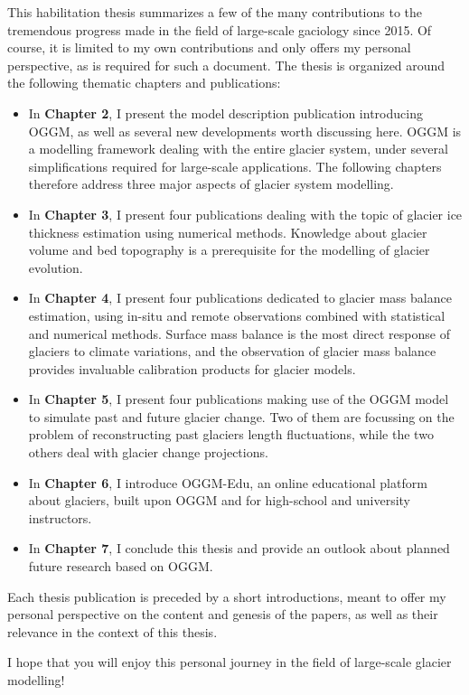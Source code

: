 This habilitation thesis summarizes a few of the many contributions to the tremendous progress made in the field of
large-scale gaciology since 2015. Of course, it is limited to my own contributions and only offers my personal perspective,
as is required for such a document. The thesis is organized around the following thematic chapters and publications:
\begin{itemize}[nosep]
\item {} 
In \textbf{Chapter 2}, I present the model description publication introducing OGGM, as well as several new developments
worth discussing here. OGGM is a modelling framework dealing with the entire glacier system, under several
simplifications required for large-scale applications. The following chapters therefore address three major aspects of
glacier system modelling.

\item {} 
In \textbf{Chapter 3}, I present four publications dealing with the topic of glacier ice thickness estimation using
numerical methods. Knowledge about glacier volume and bed topography is a prerequisite for the modelling of glacier
evolution.

\item {} 
In \textbf{Chapter 4}, I present four publications dedicated to glacier mass balance estimation, using in-situ and remote
observations combined with statistical and numerical methods. Surface mass balance is the most direct response of
glaciers to climate variations, and the observation of glacier mass balance provides invaluable calibration products
for glacier models.

\item {} 
In \textbf{Chapter 5}, I present four publications making use of the OGGM model to simulate past and future glacier change.
Two of them are focussing on the problem of reconstructing past glaciers length fluctuations, while the two others
deal with glacier change projections.

\item {} 
In \textbf{Chapter 6}, I introduce OGGM-Edu, an online educational platform about glaciers, built upon OGGM and for
high-school and university instructors.

\item {} 
In \textbf{Chapter 7}, I conclude this thesis and provide an outlook about planned future research based on OGGM.

\end{itemize}

Each thesis publication is preceded by a short introductions, meant to offer my personal
perspective on the content and genesis of the papers, as well as their relevance in the context
of this thesis.

I hope that you will enjoy this personal journey in the field of large-scale glacier modelling!